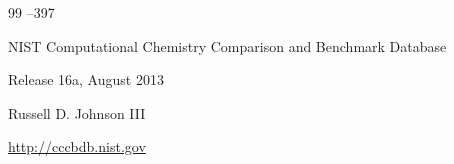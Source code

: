 \begin{thebibliography}{99}
--397





\preprint NIST Computational Chemistry Comparison and Benchmark Database

\yr Release 16a, August 2013

\ed Russell D. Johnson III

\elink \url{http://cccbdb.nist.gov}







\end{thebibliography}



\EngDate





\Russian

\newpage




%

